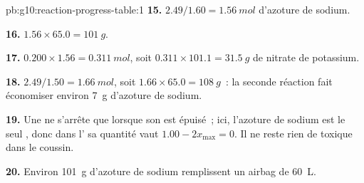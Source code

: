 \begin{solution}{pb:g10:reaction-progress-table:1}
\textbf{15.} $2.49 / 1.60 = \qty{1.56}{mol}$ d'azoture de sodium.

\textbf{16.} $1.56 \times 65.0 = \qty{101}{g}$.

\textbf{17.} $0.200 \times 1.56 = \qty{0.311}{mol}$, soit
$0.311 \times 101.1 = \qty{31.5}{g}$ de nitrate de potassium.

\textbf{18.} $2.49 / 1.50 = \qty{1.66}{mol}$, soit
$1.66 \times 65.0 = \qty{108}{g}$~: la seconde réaction fait économiser
environ \qty{7}{g} d'azoture de sodium.

\textbf{19.} Une  ne s'arrête que lorsque son  est épuisé~; ici, l'azoture de sodium est le seul , donc
dans l' sa quantité vaut $1.00 - 2x_{\max} = 0$. Il ne reste
rien de toxique dans le coussin.

\textbf{20.} Environ \qty{101}{g} d'azoture de sodium remplissent un
airbag de \qty{60}{L}.
\end{solution}
